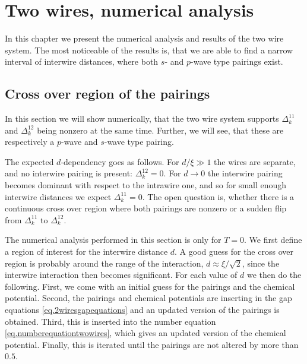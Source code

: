 
\chapter{Two wires, numerical analysis} %

\label{Chapter10} %


In this chapter we present the numerical analysis and results of the two wire system. The most noticeable of the results is, that we are able to find a narrow interval of interwire distances, where both $s$- and $p$-wave type pairings exist. 

\section{Cross over region of the pairings}
In this section we will show numerically, that the two wire system supports $\Delta^{11}_k$ and $\Delta^{12}_k$ being nonzero at the same time. Further, we will see, that these are respectively a $p$-wave and $s$-wave type pairing. 

The expected $d$-dependency goes as follows. For $d/\xi \gg 1$ the wires are separate, and no interwire pairing is present: $\Delta^{12}_k = 0$. For $d\to 0$ the interwire pairing becomes dominant with respect to the intrawire one, and so for small enough interwire distances we expect $\Delta^{11}_k = 0$. The open question is, whether there is a continuous cross over region where both pairings are nonzero or a sudden flip from $\Delta^{11}_k$ to $\Delta^{12}_k$.

The numerical analysis performed in this section is only for $T = 0$. We first define a region of interest for the interwire distance $d$. A good guess for the cross over region is probably around the range of the interaction, $d \approx \xi/\sqrt{2}$, since the interwire interaction then becomes significant. For each value of $d$ we then do the following. First, we come with an initial guess for the pairings and the chemical potential. Second, the pairings and chemical potentials are inserting in the gap equations \ref{eq.2wiresgapequations} and an updated version of the pairings is obtained. Third, this is inserted into the number equation \ref{eq.numberequationtwowires}, which gives an updated version of the chemical potential. Finally, this is iterated until the pairings are not altered by more than $0.5$\textperthousand. 

